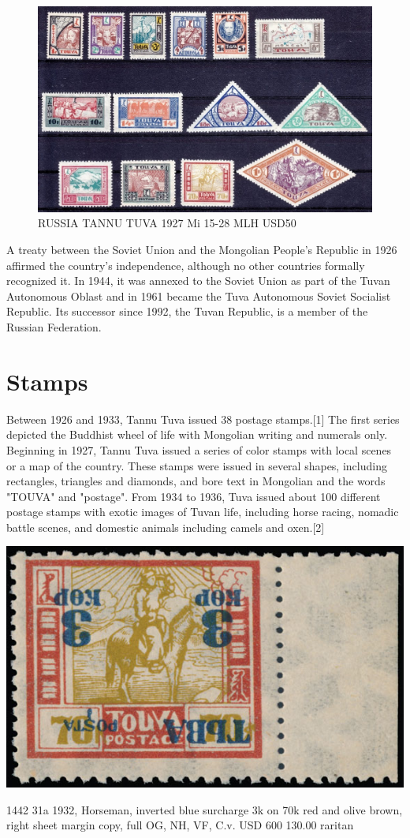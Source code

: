 \begin{figure}[htp]
\includegraphics[width=.80\textwidth]{../tannu-tuva/1937-set.jpg}
\caption{RUSSIA TANNU TUVA 1927 Mi 15-28 MLH USD50}
\end{figure}


A treaty between the Soviet Union and the Mongolian People's Republic in 1926 affirmed the country's independence, although no other countries formally recognized it. In 1944, it was annexed to the Soviet Union as part of the Tuvan Autonomous Oblast and in 1961 became the Tuva Autonomous Soviet Socialist Republic. Its successor since 1992, the Tuvan Republic, is a member of the Russian Federation.

\section{Stamps}

Between 1926 and 1933, Tannu Tuva issued 38 postage stamps.[1] The first series depicted the Buddhist wheel of life with Mongolian writing and numerals only. Beginning in 1927, Tannu Tuva issued a series of color stamps with local scenes or a map of the country. These stamps were issued in several shapes, including rectangles, triangles and diamonds, and bore text in Mongolian and the words "TOUVA" and "postage".
From 1934 to 1936, Tuva issued about 100 different postage stamps with exotic images of Tuvan life, including horse racing, nomadic battle scenes, and domestic animals including camels and oxen.[2] 

\begin{marginfigure}
\includegraphics[width=0.95\linewidth]{../tannu-tuva/31a.jpg}
\caption{1442	 31a	
1932, Horseman, inverted blue surcharge 3k on 70k red and olive brown, right sheet margin copy, full OG, NH, VF, C.v. USD 600
130.00 raritan
}
\end{marginfigure}


